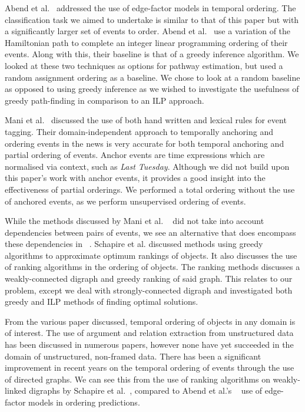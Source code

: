 \documentclass[bsc,frontabs,twoside,singlespacing,parskip,deptreport]{infthesis}     %
\begin{document}
Abend et al.~\cite{abend2015lexical} addressed the use of
edge-factor models in temporal ordering. The classification task we aimed to undertake is similar to that of this paper
but with a significantly larger set of events to order.
Abend et al.~\cite{abend2015lexical} use a variation of the Hamiltonian path
to complete an integer linear programming ordering of their events. Along with this, their baseline is that of a greedy inference algorithm.
We looked at these two techniques as options for pathway estimation, but used a random assignment ordering as
a baseline. We chose to look at a random baseline as opposed to using greedy inference as
we wished to investigate the usefulness of greedy path-finding in comparison to an ILP approach.

Mani et al.~\cite{mani2006machine} discussed the use of both hand written and lexical rules for event tagging.
Their domain-independent approach to temporally anchoring and ordering events in the news is very accurate for both temporal
anchoring and partial ordering of events. Anchor events are time expressions which are normalised via
context, such as \textit{Last Tuesday}. Although we did not build upon this paper's work with
anchor events, it provides a good insight into the effectiveness of
partial orderings. We performed a total ordering without the use of anchored events,
as we perform unsupervised ordering of events.

While the methods discussed by Mani et al. ~\cite{mani2006machine} did not take into account dependencies between pairs of events, 
we see an alternative that does encompass
these dependencies in ~\cite{schapire1998learning}.
Schapire et al. discussed methods using greedy algorithms to approximate optimum rankings of objects.
It also discusses the use of ranking algorithms in the ordering of objects. The ranking methods discusses a
weakly-connected digraph and greedy ranking of said graph. This relates to our problem,
except we deal with strongly-connected digraph and investigated both greedy and ILP methods of finding
optimal solutions.


From the various paper discussed, temporal ordering of objects in any domain is of interest.
The use of argument and relation extraction from unstructured data has been discussed in numerous papers,
however none have yet succeeded in the domain of unstructured, non-framed data.
There has been a significant improvement in recent years on the temporal ordering of events through the use of
directed graphs. We can see this from the use of ranking algorithms on weakly-linked
digraphs by Schapire et al.~\cite{schapire1998learning}, compared to Abend et al.'s ~\cite{abend2015lexical} use of edge-factor models in ordering predictions. 
\end{document}
